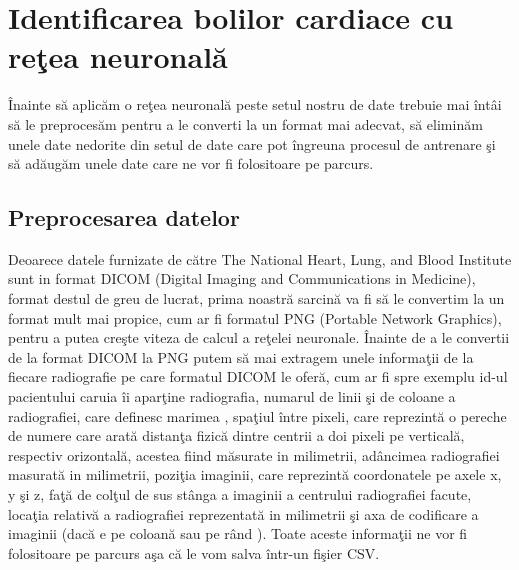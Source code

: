 \chapter{Identificarea bolilor cardiace cu re\c{t}ea neuronal\u{a}}

\^{I}nainte s\u{a} aplic\u{a}m o re\c{t}ea neuronal\u{a} peste setul nostru de date trebuie mai \^{i}nt\^{a}i s\u{a} le preproces\u{a}m pentru a le converti la un format mai adecvat, s\u{a} elimin\u{a}m unele date nedorite din setul de date care pot \^{i}ngreuna procesul de antrenare \c{s}i s\u{a} ad\u{a}ug\u{a}m unele date care ne vor fi folositoare pe parcurs.

\section{Preprocesarea datelor}

Deoarece datele furnizate de c\u{a}tre The National Heart, Lung, and Blood Institute sunt in format DICOM (Digital Imaging and Communications in Medicine), format destul de greu de lucrat, prima noastr\u{a} sarcin\u{a} va fi s\u{a} le convertim la un format mult mai propice, cum ar fi formatul PNG (Portable Network Graphics), pentru a putea cre\c{s}te viteza de calcul a re\c{t}elei neuronale. \^{I}nainte de a le convertii de la format DICOM la PNG putem s\u{a} mai extragem unele informa\c{t}ii de la fiecare radiografie pe care formatul DICOM le ofer\u{a}, cum ar fi spre exemplu  id-ul pacientului caruia \^{i}i apar\c{t}ine radiografia, numarul de linii \c{s}i de coloane a radiografiei, care definesc marimea , spa\c{t}iul \^{i}ntre pixeli, care reprezint\u{a} o pereche de numere care arat\u{a} distan\c{t}a fizic\u{a} dintre centrii a doi pixeli pe vertical\u{a}, respectiv orizontal\u{a}, acestea fiind m\u{a}surate in milimetrii, ad\^{a}ncimea radiografiei masurat\u{a} in milimetrii, pozi\c{t}ia imaginii, care reprezint\u{a} coordonatele pe axele x, y \c{s}i z, fa\c{t}\u{a} de col\c{t}ul de sus st\^{a}nga a imaginii a centrului  radiografiei facute, loca\c{t}ia relativ\u{a} a radiografiei reprezentat\u{a} in milimetrii \c{s}i axa de codificare a imaginii (dac\u{a} e pe coloan\u{a} sau pe r\^{a}nd ). Toate aceste informa\c{t}ii ne vor fi folositoare pe parcurs a\c{s}a c\u{a} le vom salva \^{i}ntr-un fi\c{s}ier CSV.

\par

